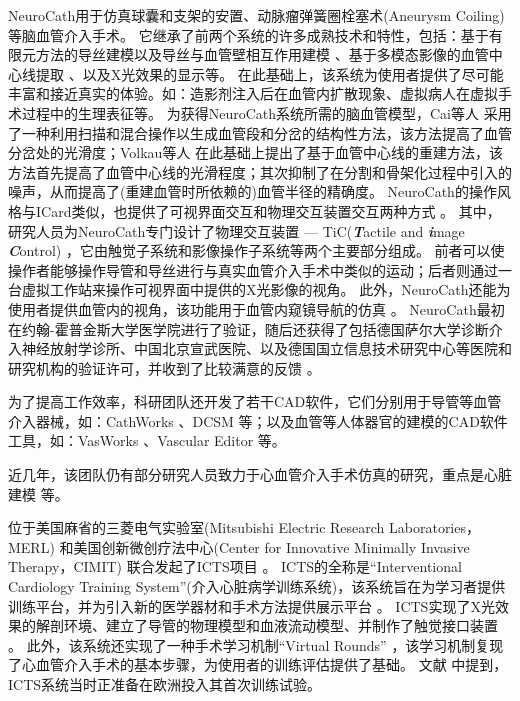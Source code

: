 NeuroCath用于仿真球囊和支架的安置、动脉瘤弹簧圈栓塞术(Aneurysm Coiling)等脑血管介入手术。
它继承了前两个系统的许多成熟技术和特性，包括：基于有限元方法的导丝建模以及导丝与血管壁相互作用建模 \cite{Wang1996daVinci,Chui1996daVinci}、基于多模态影像的血管中心线提取 \cite{Wang1998ICard}、以及X光效果的显示\cite{Wang1998aICard,Wang1998ICard}等。%
在此基础上，该系统为使用者提供了尽可能丰富和接近真实的体验。如：造影剂注入后在血管内扩散现象、虚拟病人在虚拟手术过程中的生理表征等。
为获得NeuroCath系统所需的脑血管模型，Cai等人 \cite{Ye2002Vessel,Cai2003aVessel,Cai2003Vessel}采用了一种利用扫描和混合操作以生成血管段和分岔的结构性方法，该方法提高了血管分岔处的光滑度；Volkau等人 \cite{Volkau2005Vessel,Volkau2008Vessel}在此基础上提出了基于血管中心线的重建方法，该方法首先提高了血管中心线的光滑程度；其次抑制了在分割和骨架化过程中引入的噪声，从而提高了(重建血管时所依赖的)血管半径的精确度。%
NeuroCath的操作风格与ICard类似，也提供了可视界面交互和物理交互装置交互两种方式 \cite{Nowinski2001NeuroCath}。
其中，研究人员为NeuroCath专门设计了物理交互装置 --- TiC(\textbf{\textit{T}}actile and \textbf{\textit{i}}mage \textbf{\textit{C}}ontrol)\cite{Chui1999TiC} \cite{Ma1999TiC}，它由触觉子系统和影像操作子系统等两个主要部分组成。%
前者可以使操作者能够操作导管和导丝进行与真实血管介入手术中类似的运动；后者则通过一台虚拟工作站来操作可视界面中提供的X光影像的视角。
此外，NeuroCath还能为使用者提供血管内的视角，该功能用于血管内窥镜导航的仿真 \cite{Nowinski2001NeuroCath}。
NeuroCath最初在约翰-霍普金斯大学医学院进行了验证，随后还获得了包括德国萨尔大学诊断介入神经放射学诊所、中国北京宣武医院、以及德国国立信息技术研究中心等医院和研究机构的验证许可，并收到了比较满意的反馈 \cite{Ma2007NeuroCath}。%

为了提高工作效率，科研团队还开发了若干CAD软件，它们分别用于导管等血管介入器械，如：CathWorks \cite{Cai1998CathWorks,Cai2000CathWorks}、DCSM \cite{Li2001DCSM}等；以及血管等人体器官的建模的CAD软件工具，如：VasWorks \cite{Cai2003Vessel}、Vascular Editor \cite{Ma2007NeuroCath}等。%

近几年，该团队仍有部分研究人员致力于心血管介入手术仿真的研究，重点是心脏建模 \cite{Chiang2011,Chiang2012}等。

位于美国麻省的三菱电气实验室(Mitsubishi Electric Research Laboratories，MERL) \cite{merlweb}和美国创新微创疗法中心(Center for Innovative Minimally Invasive Therapy，CIMIT) \cite{cimitweb}联合发起了ICTS项目 \cite{Dawson2000ICTS,Cotin2000ICTS,Shaffer1999ICTS}。%
ICTS的全称是“Interventional Cardiology Training System”(介入心脏病学训练系统)，该系统旨在为学习者提供训练平台，并为引入新的医学器材和手术方法提供展示平台 \cite{Cotin2000ICTS}。%
ICTS实现了X光效果的解剖环境、建立了导管的物理模型和血液流动模型、并制作了触觉接口装置 \cite{Cotin2000ICTS}。%
此外，该系统还实现了一种手术学习机制“Virtual Rounds” \cite{Shaffer1999ICTS}，该学习机制复现了心血管介入手术的基本步骤，为使用者的训练评估提供了基础。
文献 \cite{Dawson2000ICTS}中提到，ICTS系统当时正准备在欧洲投入其首次训练试验。

